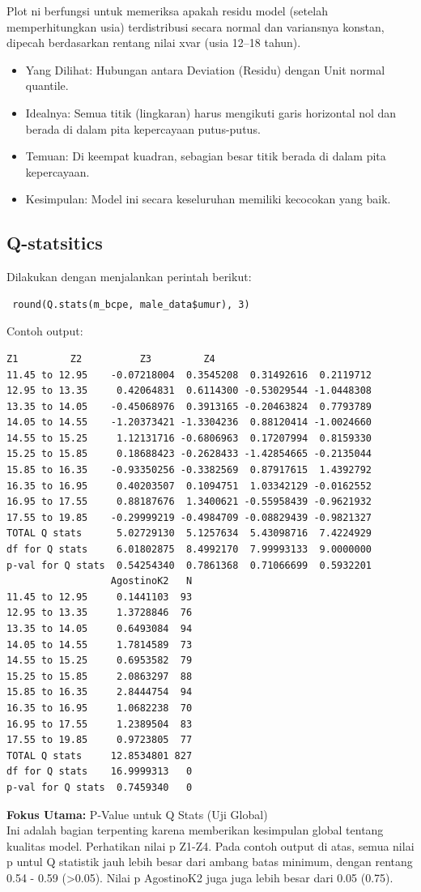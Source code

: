 \documentclass[11pt, a4paper]{article}
\begin{document}
\noindent
Plot ni berfungsi untuk memeriksa apakah residu model (setelah memperhitungkan usia) terdistribusi secara normal dan variansnya konstan, dipecah berdasarkan rentang nilai xvar (usia 12–18 tahun).
\begin{itemize}
    \item Yang Dilihat: Hubungan antara Deviation (Residu) dengan Unit normal quantile.
    \item Idealnya: Semua titik (lingkaran) harus mengikuti garis horizontal nol dan berada di dalam pita kepercayaan putus-putus.
    \item Temuan: Di keempat kuadran, sebagian besar titik berada di dalam pita kepercayaan.
    \item Kesimpulan: Model ini secara keseluruhan memiliki kecocokan yang baik.
\end{itemize}

\subsection{Q-statsitics}
Dilakukan dengan menjalankan perintah berikut:
\begin{lstlisting}
 round(Q.stats(m_bcpe, male_data$umur), 3)
\end{lstlisting}
Contoh output:
\begin{Verbatim}[frame=single]
                           Z1         Z2          Z3         Z4
11.45 to 12.95    -0.07218004  0.3545208  0.31492616  0.2119712
12.95 to 13.35     0.42064831  0.6114300 -0.53029544 -1.0448308
13.35 to 14.05    -0.45068976  0.3913165 -0.20463824  0.7793789
14.05 to 14.55    -1.20373421 -1.3304236  0.88120414 -1.0024660
14.55 to 15.25     1.12131716 -0.6806963  0.17207994  0.8159330
15.25 to 15.85     0.18688423 -0.2628433 -1.42854665 -0.2135044
15.85 to 16.35    -0.93350256 -0.3382569  0.87917615  1.4392792
16.35 to 16.95     0.40203507  0.1094751  1.03342129 -0.0162552
16.95 to 17.55     0.88187676  1.3400621 -0.55958439 -0.9621932
17.55 to 19.85    -0.29999219 -0.4984709 -0.08829439 -0.9821327
TOTAL Q stats      5.02729130  5.1257634  5.43098716  7.4224929
df for Q stats     6.01802875  8.4992170  7.99993133  9.0000000
p-val for Q stats  0.54254340  0.7861368  0.71066699  0.5932201
                  AgostinoK2   N
11.45 to 12.95     0.1441103  93
12.95 to 13.35     1.3728846  76
13.35 to 14.05     0.6493084  94
14.05 to 14.55     1.7814589  73
14.55 to 15.25     0.6953582  79
15.25 to 15.85     2.0863297  88
15.85 to 16.35     2.8444754  94
16.35 to 16.95     1.0682238  70
16.95 to 17.55     1.2389504  83
17.55 to 19.85     0.9723805  77
TOTAL Q stats     12.8534801 827
df for Q stats    16.9999313   0
p-val for Q stats  0.7459340   0
\end{Verbatim}
\noindent
\textbf{Fokus Utama:} P-Value untuk Q Stats (Uji Global)\\
Ini adalah bagian terpenting karena memberikan kesimpulan global tentang kualitas model. Perhatikan nilai p Z1-Z4. Pada contoh output di atas, semua nilai p untul Q statistik jauh lebih besar dari ambang batas minimum, dengan rentang 0.54 - 0.59 (>0.05). Nilai p AgostinoK2 juga juga lebih besar dari 0.05 (0.75). 
\end{document}
